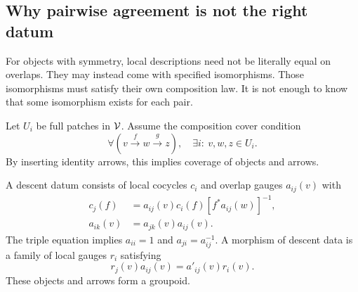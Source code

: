 
\label{sec:descent}
\subsection{Why pairwise agreement is not the right datum}
For objects with symmetry, local descriptions need not be literally equal on overlaps. They may instead come with specified isomorphisms. Those isomorphisms must satisfy their own composition law. It is not enough to know that some isomorphism exists for each pair.

Let \(U_i\) be full patches in \(\mathcal V\). Assume the composition cover condition
\begin{equation}\label{eq:compositioncover}
 \forall(v\xrightarrow f w\xrightarrow g z),\quad
 \exists i:\ v,w,z\in U_i.
\end{equation}
By inserting identity arrows, this implies coverage of objects and arrows.

A descent datum consists of local cocycles \(c_i\) and overlap gauges \(a_{ij}(v)\) with
\begin{align}
 c_j(f)&=a_{ij}(v)c_i(f)[f^*a_{ij}(w)]^{-1},\label{eq:localgauge}\\
 a_{ik}(v)&=a_{jk}(v)a_{ij}(v).\label{eq:triple}
\end{align}
The triple equation implies \(a_{ii}=1\) and \(a_{ji}=a_{ij}^{-1}\). A morphism of descent data is a family of local gauges \(r_i\) satisfying
\[
 r_j(v)a_{ij}(v)=a'_{ij}(v)r_i(v).
\]
These objects and arrows form a groupoid.

